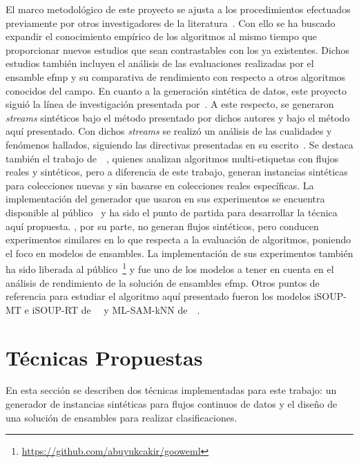 El marco metodológico de este proyecto se ajusta a los procedimientos efectuados
previamente por otros investigadores de la
literatura~\cite{osojnik_multi-label_2017, sousa_multi-label_2018,
	buyukcakir_novel_2018, zheng_survey_2020, read_scalable_2012}. Con ello se ha
buscado expandir el conocimiento empírico de los algoritmos al mismo tiempo que
proporcionar nuevos estudios que sean contrastables con los ya existentes.
Dichos estudios también incluyen el análisis de las evaluaciones realizadas por
el ensamble \acrshort{efmp} y su comparativa de rendimiento con respecto a otros
algoritmos conocidos del campo. En cuanto a la generación sintética de datos,
este proyecto siguió la línea de investigación presentada
por~\citeauthor{read_generating_2009}. A este respecto, se generaron
\textit{streams} sintéticos bajo el método presentado por dichos autores y bajo
el método aquí presentado. Con dichos \textit{streams} se realizó un análisis de
las cualidades y fenómenos hallados, siguiendo las directivas presentadas en su
escrito~\cite{read_generating_2009}. Se destaca también el trabajo
de~\citeauthor{read_scalable_2012}~\cite{read_scalable_2012}, quienes analizan
algoritmos multi-etiquetas con flujos reales y sintéticos, pero a diferencia de
este trabajo, generan instancias sintéticas para colecciones nuevas y sin
basarse en colecciones reales específicas. La implementación del generador que
usaron en sus experimentos se encuentra disponible al
público~\cite{read_moa_2012} y ha sido el punto de partida para desarrollar la
técnica aquí propuesta.  \citeauthor{buyukcakir_novel_2018}, por su parte, no
generan flujos sintéticos, pero conducen experimentos similares en lo que
respecta a la evaluación de algoritmos, poniendo el foco en modelos de
ensambles.  La implementación de sus experimentos también ha sido liberada al
público~\footnote{\url{https://github.com/abuyukcakir/gooweml}} y fue uno de los
modelos a tener en cuenta en el análisis de rendimiento de la solución de
ensambles \acrshort{efmp}. Otros puntos de referencia para estudiar el algoritmo
aquí presentado fueron los modelos iSOUP-MT e iSOUP-RT
de~\citeauthor{osojnik_multi-label_2017}~\cite{osojnik_multi-label_2017} y
ML-SAM-kNN
de~\citeauthor{roseberry_multi-label_2018}~\cite{roseberry_multi-label_2018}.
\section{Técnicas Propuestas} En esta sección se describen dos técnicas
implementadas para este trabajo: un generador de instancias sintéticas para
flujos continuos de datos y el diseño de una solución de ensambles para realizar
clasificaciones.

